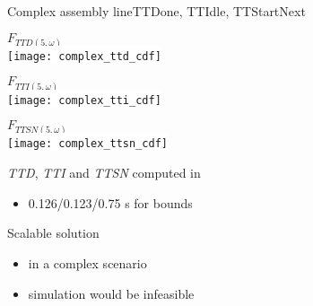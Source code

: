     \begin{frame}{Complex assembly line}{TTDone, TTIdle, TTStartNext}
      \begin{minipage}{0.3\textwidth}
        \begin{center}
          {\tiny $F_{TTD(5,\omega)}$}\\
          \colorbox{white}{\texttt{[image: complex\_ttd\_cdf]}}
        \end{center}
      \end{minipage}
      \begin{minipage}{0.3\textwidth}
        \begin{center}
          {\tiny $F_{TTI(5,\omega)}$}\\
          \colorbox{white}{\texttt{[image: complex\_tti\_cdf]}}
        \end{center}
      \end{minipage}
      \begin{minipage}{0.3\textwidth}
        \begin{center}
          {\tiny $F_{TTSN(5,\omega)}$}\\
          \colorbox{white}{\texttt{[image: complex\_ttsn\_cdf]}}
        \end{center}
      \end{minipage}
      
      \vspace{4em}
      \begin{minipage}{0.5\textwidth}
        \textit{TTD}, \textit{TTI} and \textit{TTSN} computed in
        \begin{itemize}
          \item 0.126/0.123/0.75 s for bounds
        \end{itemize}
      \end{minipage}
      \begin{minipage}{0.45\textwidth}
        Scalable solution
        \begin{itemize}
          \item in a complex scenario
          \item simulation would be infeasible
        \end{itemize}
      \end{minipage}
    \end{frame}

